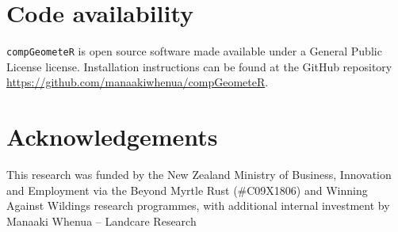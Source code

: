 \documentclass[12pt, a4paper]{article}
\begin{document}
\section{Code availability}

\texttt{compGeometeR} is open source software made available under a General Public License license. Installation instructions can be found at the GitHub repository \url{https://github.com/manaakiwhenua/compGeometeR}.

\section{Acknowledgements}

This research was funded by the New Zealand Ministry of Business, Innovation and Employment via the Beyond Myrtle Rust (\#C09X1806) and Winning Against Wildings research programmes, with additional internal investment by Manaaki Whenua -- Landcare Research



\end{document}
